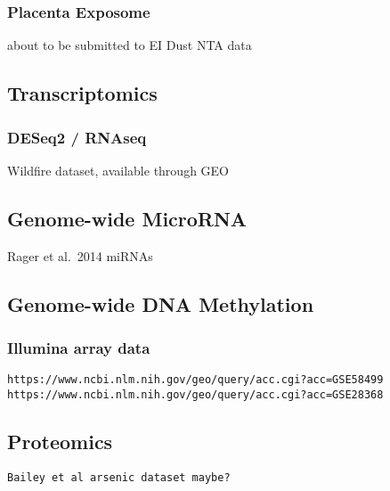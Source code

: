 \documentclass[
]{article}
\begin{document}
\hypertarget{placenta-exposome}{%
\subsubsection{Placenta Exposome}\label{placenta-exposome}}

about to be submitted to EI
Dust NTA data

\hypertarget{transcriptomics}{%
\subsection{Transcriptomics}\label{transcriptomics}}

\hypertarget{deseq2-rnaseq}{%
\subsubsection{DESeq2 / RNAseq}\label{deseq2-rnaseq}}

Wildfire dataset, available through GEO

\hypertarget{genome-wide-microrna}{%
\subsection{Genome-wide MicroRNA}\label{genome-wide-microrna}}

Rager et al.~2014 miRNAs

\hypertarget{genome-wide-dna-methylation}{%
\subsection{Genome-wide DNA Methylation}\label{genome-wide-dna-methylation}}

\hypertarget{illumina-array-data}{%
\subsubsection{Illumina array data}\label{illumina-array-data}}

\begin{verbatim}
https://www.ncbi.nlm.nih.gov/geo/query/acc.cgi?acc=GSE58499
https://www.ncbi.nlm.nih.gov/geo/query/acc.cgi?acc=GSE28368
\end{verbatim}

\hypertarget{proteomics}{%
\subsection{Proteomics}\label{proteomics}}

\begin{verbatim}
Bailey et al arsenic dataset maybe?
\end{verbatim}
\end{document}
